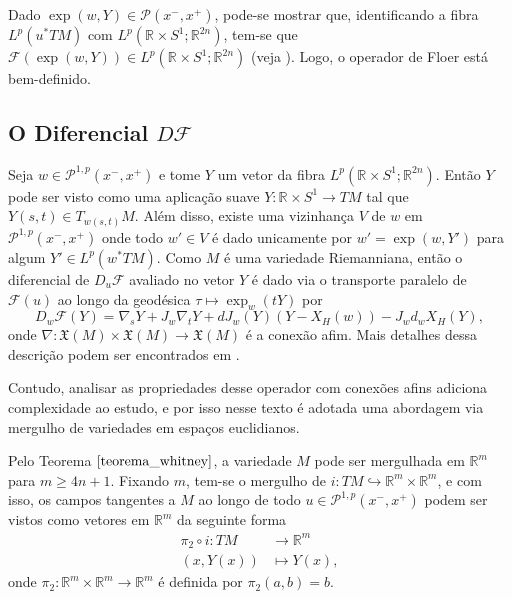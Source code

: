 \documentclass[12pt]{book}
\newcommand{\caminhosexponenciaisconectantesabrev}{\mathcal{P}(x^{-},x^{+})}
\newcommand{\caminhosexponenciaisconectantes}[2]{\mathcal{P}^{1,p}(#1, #2)}
\newcommand{\caminhosexponenciaisconectantespadrao}{\caminhosexponenciaisconectantes{x^{-}}{x^{+}}}
\newcommand{\campossuaves}[1]{\mathfrak{X}(#1)}
\newcommand{\circulo}{S^{1}}
\newcommand{\diferencialfloer}{D\operadorFloer}
\newcommand{\diferencialfloerponto}[1]{D_{#1}\operadorFloer}
\newcommand{\espacoLp}[1]{L^{p}(#1)}
\newcommand{\espacotangenteponto}[2]{T_{#1}#2}
\newcommand{\operadorFloer}{\mathcal{F}}
\newcommand{\operadorFloerParametro}[1]{\mathcal{F}(#1)}
\newcommand{\pullbackfibradotangente}[2]{#1^{*}T#2}
\newcommand{\pullbackfibradotangenteM}[1]{\pullbackfibradotangente{#1}{M}}
\newcommand{\retacartesianocirculo}{\real{} \times \circulo}
\newcommand{\real}[1]{\mathbb{R}^{#1}}
\begin{document}
	Dado $\exp(w,Y) \in \caminhosexponenciaisconectantesabrev$, pode-se mostrar que, identificando a fibra $\espacoLp{\pullbackfibradotangenteM{u}}$ com $\espacoLp{\retacartesianocirculo;\real{2n}}$, tem-se que $\operadorFloerParametro{\exp(w,Y)}\in \espacoLp{\retacartesianocirculo;\real{2n}}$ (veja \cite{audi_floer_homology}). Logo, o operador de Floer está bem-definido.
	
	\subsection{O Diferencial $\diferencialfloer$}\label{secao_operador_floer}
	
	Seja $w \in \caminhosexponenciaisconectantespadrao$ e tome $Y $ um vetor da fibra $ \espacoLp{\retacartesianocirculo;\real{2n}}$. Então $Y$ pode ser visto como uma aplicação suave $Y:\retacartesianocirculo\to TM$ tal que $Y(s,t)\in \espacotangenteponto{w(s,t)}{M}$. Além disso, existe uma vizinhança $V$ de $w$ em $\caminhosexponenciaisconectantespadrao$ onde todo $w' \in V$ é dado unicamente por $w'=\exp(w, Y')$ para algum $Y'\in \espacoLp{\pullbackfibradotangenteM{w}}$. Como $M$ é uma variedade Riemanniana, então o diferencial de $\diferencialfloerponto{u}$ avaliado no vetor $Y$ é dado via o transporte paralelo de $\operadorFloerParametro{u}$ ao longo da geodésica $\tau \mapsto \exp_{w}(tY)$ por 
	$$
	\diferencialfloerponto{w}(Y) = \nabla_{s}Y + J_{w}\nabla_{t}Y + dJ_{w}(Y)(Y - X_{H}(w)) - J_{w}d_{w}X_{H}(Y),
	$$
	onde $\nabla:\campossuaves{M}\times \campossuaves{M} \to \campossuaves{M}$ é a conexão afim. Mais detalhes dessa descrição podem ser encontrados em \cite{salamon_lecture}. 
	
	Contudo, analisar as propriedades desse operador com conexões afins adiciona complexidade ao estudo, e por isso nesse texto é adotada uma abordagem via mergulho de variedades em espaços euclidianos.
	
	Pelo Teorema $\ref{teorema_whitney}$, a variedade $M$ pode ser mergulhada em $\real{m}$ para $m\geq 4n+1$. Fixando $m$, tem-se o mergulho de $i: TM \hookrightarrow \real{m}\times\real{m}$, e com isso, os campos tangentes a $M$ ao longo de todo $u \in \caminhosexponenciaisconectantespadrao$ podem ser vistos como vetores em $\real{m}$ da seguinte forma
	$$
	\begin{aligned}
	\pi_{2}\circ i : TM &\to \real{m}
	\\
	(x, Y(x)) &\mapsto Y(x),
	\end{aligned}
	$$
	onde $\pi_{2}:\real{m}\times \real{m}\to \real{m} 
	$ é definida por $\pi_{2}(a,b) = b$.
	
\end{document}

